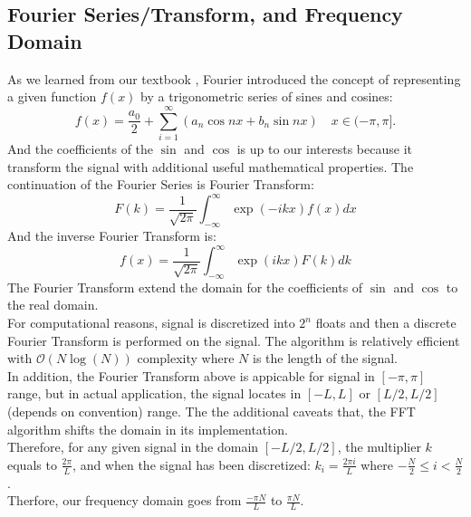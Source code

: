 \documentclass{article}
\begin{document}
\subsection{Fourier Series/Transform, and Frequency Domain}
    As we learned from our textbook \cite{kutz_2013}, Fourier introduced the concept of representing a given function $f(x)$ by a trigonometric series of sines and cosines:
    \begin{equation}
        f(x) = \frac{a_0}{2} + \sum_{i=1}^\infty \left(a_n\cos{nx} + b_n\sin{nx}\right) \quad x \in (-\pi,\pi].
        \label{eqn:fourierseries}
    \end{equation}
    And the coefficients of the $\sin$ and $\cos$ is up to our interests because it transform the signal with additional useful mathematical properties. 
    The continuation of the Fourier Series is Fourier Transform: 
    \begin{equation}\label{eqn:fourier-transform}
        F(k) = \frac{1}{\sqrt{2\pi}}\int_{-\infty}^\infty
        \exp(-ikx)f(x) dx
    \end{equation}
    And the inverse Fourier Transform is: 
    \begin{equation}
        f(x) = \frac{1}{\sqrt{2\pi}}
        \int_{-\infty}^\infty \exp(ikx) F(k)dk
    \end{equation}
    The Fourier Transform extend the domain for the coefficients of $\sin$ and $\cos$ to the real domain. 
    \\
    For computational reasons, signal is discretized into $2^n$ floats and then a discrete Fourier Transform is performed on the signal. The algorithm is relatively efficient with $\mathcal{O}(N\log(N))$ complexity where $N$ is the length of the signal. 
    \\
    In addition, the Fourier Transform above is appicable for signal in $[-\pi, \pi]$ range, but in actual application, the signal locates in $[-L, L]$ or $[L/2, L/2]$ (depends on convention) range. The the additional caveats that, the FFT algorithm shifts the domain in its implementation. 
    \\
    Therefore, for any given signal in the domain $[-L/2, L/2]$, the multiplier $k$ equals to $\frac{2\pi}{L}$, and when the signal has been discretized: $k_i = \frac{2\pi i}{L}$ where $-\frac{N}{2}\le i< \frac{N}{2}$.
    \\
    Therfore, our frequency domain goes from $\frac{-\pi N}{L}$ to $\frac{\pi N}{L}$. 
\end{document}
